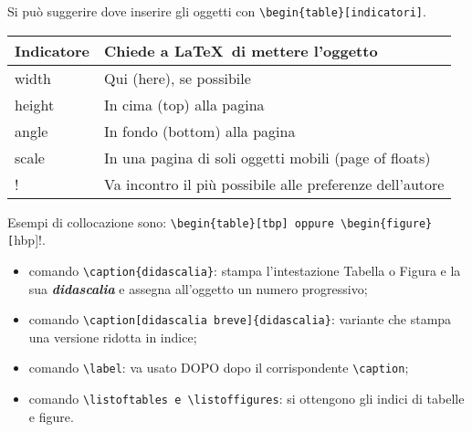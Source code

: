 \documentclass{article}
\begin{document}
                    Si può suggerire dove inserire gli oggetti con \verb!\begin{table}[indicatori]!.

                    \begin{center}
                        \begin{tabular}{II}
                            \toprule
                            Indicatore &  Chiede a \LaTeX\ di mettere l'oggetto \\
                            \midrule
                            width & Qui (here), se possibile \\
                            height & In cima (top) alla pagina \\
                            angle & In fondo (bottom) alla pagina \\
                            scale & In una pagina di soli oggetti mobili (page of floats) \\
                            ! & Va incontro il più possibile alle preferenze dell'autore \\
                            \bottomrule
                        \end{tabular}
                    \end{center}

                    Esempi di collocazione sono: \verb!\begin{table}[tbp] oppure \begin{figure}[!hbp]!.
                    \begin{itemize}
                        \item comando \verb!\caption{didascalia}!: stampa l'intestazione Tabella o Figura e la sua \emph{\textbf{didascalia}} e assegna all'oggetto un numero progressivo;
                        \item comando \verb!\caption[didascalia breve]{didascalia}!: variante che stampa una versione ridotta in indice;
                        \item comando \verb!\label!: va usato DOPO dopo il corrispondente \verb!\caption!;
                        \item comando \verb!\listoftables e \listoffigures!: si ottengono gli indici di tabelle e figure.
                    \end{itemize}
                
    
\end{document}
